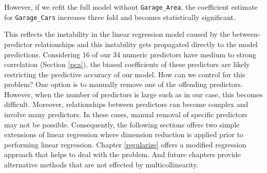 \documentclass[]{book}
\newenvironment{Shaded}{\begin{snugshade}}{\end{snugshade}}
\newcommand{\CommentTok}[1]{\textcolor[rgb]{0.56,0.35,0.01}{\textit{#1}}}
\newcommand{\DataTypeTok}[1]{\textcolor[rgb]{0.13,0.29,0.53}{#1}}
\newcommand{\DecValTok}[1]{\textcolor[rgb]{0.00,0.00,0.81}{#1}}
\newcommand{\KeywordTok}[1]{\textcolor[rgb]{0.13,0.29,0.53}{\textbf{#1}}}
\newcommand{\NormalTok}[1]{#1}
\newcommand{\OperatorTok}[1]{\textcolor[rgb]{0.81,0.36,0.00}{\textbf{#1}}}
\newcommand{\StringTok}[1]{\textcolor[rgb]{0.31,0.60,0.02}{#1}}
\theoremstyle{definition}
\theoremstyle{definition}
\theoremstyle{definition}
\theoremstyle{remark}
\begin{document}
However, if we refit the full model without \texttt{Garage\_Area}, the
coefficient estimate for \texttt{Garage\_Cars} increases three fold and
becomes statistically significant.

\begin{Shaded}
\end{Shaded}

This reflects the instability in the linear regression model caused by
the between-predictor relationships and this instability gets propagated
directly to the model predictions. Considering 16 of our 34 numeric
predictors have medium to strong correlation (Section \ref{pca}), the
biased coefficients of these predictors are likely restricting the
predictive accuracy of our model. How can we control for this problem?
One option is to manually remove one of the offending predictors.
However, when the number of predictors is large such as in our case,
this becomes difficult. Moreover, relationships between predictors can
become complex and involve many predictors. In these cases, manual
removal of specific predictors may not be possible. Consequently, the
following sections offers two simple extensions of linear regression
where dimension reduction is applied prior to performing linear
regression. Chapter \ref{regularize} offers a modified regression
approach that helps to deal with the problem. And future chapters
provide alternative methods that are not effected by multicollinearity.
\end{document}
